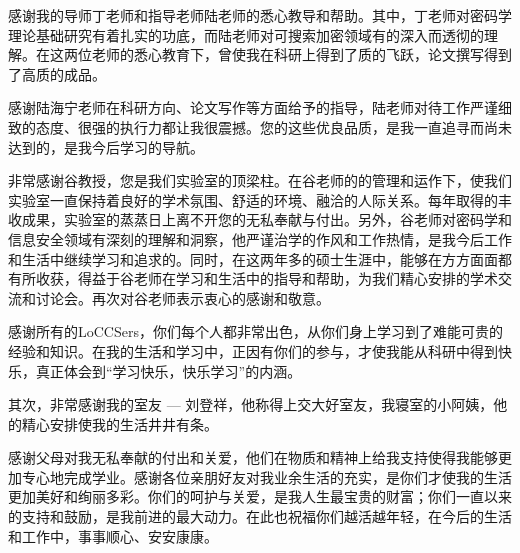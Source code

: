 
\begin{thanks}

 感谢我的导师丁老师和指导老师陆老师的悉心教导和帮助。其中，丁老师对密码学理论基础研究有着扎实的功底，而陆老师对可搜索加密领域有的深入而透彻的理解。在这两位老师的悉心教育下，曾使我在科研上得到了质的飞跃，论文撰写得到了高质的成品。

 感谢陆海宁老师在科研方向、论文写作等方面给予的指导，陆老师对待工作严谨细致的态度、很强的执行力都让我很震撼。您的这些优良品质，是我一直追寻而尚未达到的，是我今后学习的导航。

 非常感谢谷教授，您是我们实验室的顶梁柱。在谷老师的的管理和运作下，使我们实验室一直保持着良好的学术氛围、舒适的环境、融洽的人际关系。每年取得的丰收成果，实验室的蒸蒸日上离不开您的无私奉献与付出。另外，谷老师对密码学和信息安全领域有深刻的理解和洞察，他严谨治学的作风和工作热情，是我今后工作和生活中继续学习和追求的。同时，在这两年多的硕士生涯中，能够在方方面面都有所收获，得益于谷老师在学习和生活中的指导和帮助，为我们精心安排的学术交流和讨论会。再次对谷老师表示衷心的感谢和敬意。





感谢所有的LoCCSers，你们每个人都非常出色，从你们身上学习到了难能可贵的经验和知识。在我的生活和学习中，正因有你们的参与，才使我能从科研中得到快乐，真正体会到“学习快乐，快乐学习”的内涵。


其次，非常感谢我的室友 --- 刘登祥，他称得上交大好室友，我寝室的小阿姨，他的精心安排使我的生活井井有条。


感谢父母对我无私奉献的付出和关爱，他们在物质和精神上给我支持使得我能够更加专心地完成学业。感谢各位亲朋好友对我业余生活的充实，是你们才使我的生活更加美好和绚丽多彩。你们的呵护与关爱，是我人生最宝贵的财富；你们一直以来的支持和鼓励，是我前进的最大动力。在此也祝福你们越活越年轻，在今后的生活和工作中，事事顺心、安安康康。


\end{thanks}
